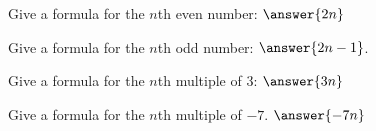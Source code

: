 \documentclass[nooutcomes]{ximera}
\begin{document}
\begin{problem}
Give a formula for the $n$th even number: $\answer{2n}$
\end{problem}

\begin{problem}
Give a formula for the $n$th odd number: $\answer{2n-1}$. 
\end{problem}

\begin{problem}
Give a formula for the $n$th multiple of $3$:  $\answer{3n}$
\end{problem}

\begin{problem}
Give a formula for the $n$th multiple of $-7$. $\answer{-7n}$
\end{problem}
\end{document}
